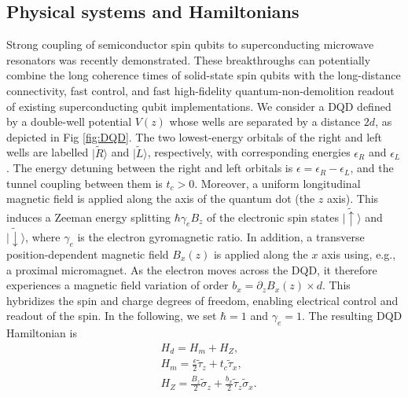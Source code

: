 \documentclass[12pt]{article}
\begin{document}
\subsection{Physical systems and Hamiltonians}

Strong coupling of semiconductor spin qubits to superconducting microwave resonators was recently demonstrated. \cite{Mi2018}\cite{Landig2018}
These breakthroughs can potentially combine the long coherence times of solid-state spin qubits with the long-distance connectivity, fast control, and fast high-fidelity quantum-non-demolition readout of existing superconducting qubit implementations.\cite{D_Anjou_2019}
We consider a DQD defined by a double-well potential $V(z)$ whose wells are separated by a distance $2d$, as depicted in Fig \ref{fig:DQD}.
The two lowest-energy orbitals of the right and left wells are labelled $|\widetilde{R}\rangle$ and $|\widetilde{L}\rangle$, respectively, with corresponding energies $\epsilon_R$ and $\epsilon_L$.
The energy detuning between the right and left orbitals is $\epsilon=\epsilon_R-\epsilon_L$, and the tunnel coupling between them is $t_c>0$. 
Moreover, a uniform longitudinal magnetic field is applied along the axis of the quantum dot (the $z$ axis). This induces a Zeeman energy splitting $\hbar \gamma_e B_z$ of the electronic spin states $|\widetilde{\uparrow}\rangle$ and $|\widetilde{\downarrow}\rangle$, where $\gamma_e$ is the electron gyromagnetic ratio. 
In addition, a transverse position-dependent magnetic field $B_x(z)$ is applied along the $x$ axis using, e.g., a proximal micromagnet. As the electron moves across the DQD, it therefore experiences a magnetic field variation of order $b_x=\partial_z B_x(z) \times d$. This hybridizes the spin and charge degrees of freedom, enabling electrical control and readout of the spin. 
In the following, we set $\hbar=1$ and $\gamma_e=1$. The resulting DQD Hamiltonian is
\begin{equation}\label{eq:DQD_Hamiltonian}
    \begin{aligned} 
        & H_d=H_m+H_Z, \\
        & H_m=\frac{\epsilon}{2} \widetilde{\tau}_z+t_c \widetilde{\tau}_x, \\
        & H_Z=\frac{B_z}{2} \widetilde{\sigma}_z+\frac{b_x}{2} \widetilde{\tau}_z \widetilde{\sigma}_x .
    \end{aligned}    
\end{equation}
\end{document}
